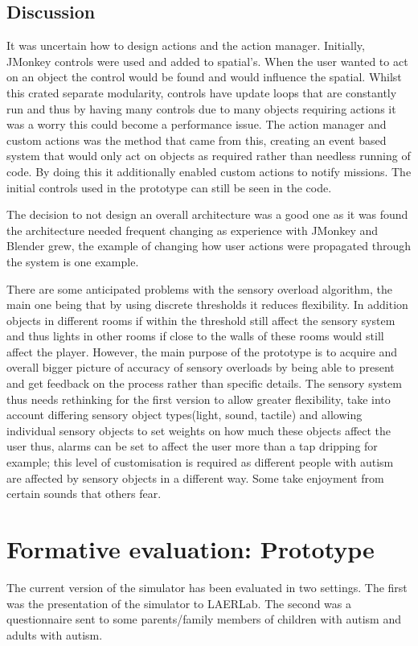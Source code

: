 \documentclass[11pt]{report}
\begin{document}
\section{Discussion}
\label{sec:p_imp_discussion}
It was uncertain how to design actions and the action manager. Initially, JMonkey controls were used and added to spatial's. When the user wanted to act on an object the control would be found and would influence the spatial. Whilst this crated separate modularity, controls have update loops that are constantly run and thus by having many controls due to many objects requiring actions it was a worry this could become a performance issue. The action manager and custom actions was the method that came from this, creating an event based system that would only act on objects as required rather than needless running of code. By doing this it additionally enabled custom actions to notify missions. The initial controls used in the prototype can still be seen in the code. 

The decision to not design an overall architecture was a good one as it was found the architecture needed frequent changing as experience with JMonkey and Blender grew, the example of changing how user actions were propagated through the system is one example.  

There are some anticipated problems with the sensory overload algorithm, the main one being that by using discrete thresholds it reduces flexibility. In addition objects in different rooms if within the threshold still affect the sensory system and thus lights in other rooms if close to the walls of these rooms would still affect the player. 
However, the main purpose of the prototype is to acquire and overall bigger picture of accuracy of sensory overloads by being able to present and get feedback on the process rather than specific details. The sensory system thus needs rethinking for the first version to allow greater flexibility, take into account differing sensory object types(light, sound, tactile) and allowing individual sensory objects to set weights on how much these objects affect the user thus, alarms can be set to affect the user more than a tap dripping for example; this level of customisation is required as different people with autism are affected by sensory objects in a different way. Some take enjoyment from certain sounds that others fear. 

\chapter{Formative evaluation: Prototype}
The current version of the simulator has been evaluated in two settings. The first was the presentation of the simulator to LAERLab. The second was a questionnaire sent to some parents/family members of children with autism and adults with autism.
\end{document}
